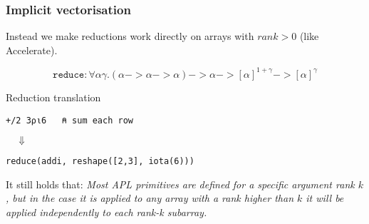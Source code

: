 \documentclass{beamer}
\begin{document}
\begin{frame}[fragile]
\frametitle{Implicit vectorisation}

Instead we make reductions work directly on arrays with $rank > 0$ (like Accelerate).

$$\texttt{reduce} : \forall\alpha\gamma. (\alpha -> \alpha -> \alpha) -> \alpha -> [\alpha]^{1+\gamma} -> [\alpha]^{\gamma}$$

\begin{block}{Reduction translation}
\vspace{-4mm}
\begin{verbatim}
+/2 3⍴⍳6   ⍝ sum each row
\end{verbatim}
$\quad\Downarrow$

\begin{verbatim}
reduce(addi, reshape([2,3], iota(6)))
\end{verbatim}
\vspace{-4mm}
\end{block}

It still holds that: \textit{Most APL primitives are defined for a
  specific argument rank $k$, but in the case it is applied to any
  array with a rank higher than $k$ it will be applied
  \textit{independently} to each rank-k subarray.}
\end{frame}
\end{document}
